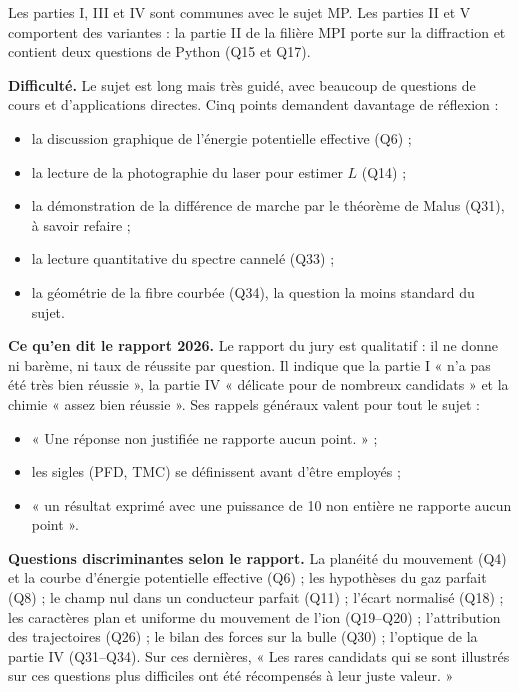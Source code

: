 \documentclass[11pt,a4paper]{article}
\providecommand{\tightlist}{\setlength{\itemsep}{0pt}\setlength{\parskip}{0pt}}
\begin{document}
Les parties I, III et IV sont communes avec le sujet MP. Les parties II et V comportent des variantes : la partie II de la filière MPI porte sur la diffraction et contient deux questions de Python (Q15 et Q17).

\textbf{Difficulté.} Le sujet est long mais très guidé, avec beaucoup de questions de cours et d'applications directes. Cinq points demandent davantage de réflexion :

\begin{itemize}
\tightlist
\item
  la discussion graphique de l'énergie potentielle effective (Q6) ;
\item
  la lecture de la photographie du laser pour estimer \(L\) (Q14) ;
\item
  la démonstration de la différence de marche par le théorème de Malus (Q31), à savoir refaire ;
\item
  la lecture quantitative du spectre cannelé (Q33) ;
\item
  la géométrie de la fibre courbée (Q34), la question la moins standard du sujet.
\end{itemize}

\textbf{Ce qu'en dit le rapport 2026.} Le rapport du jury est qualitatif : il ne donne ni barème, ni taux de réussite par question. Il indique que la partie I « n'a pas été très bien réussie », la partie IV « délicate pour de nombreux candidats » et la chimie « assez bien réussie ». Ses rappels généraux valent pour tout le sujet :

\begin{itemize}
\tightlist
\item
  « Une réponse non justifiée ne rapporte aucun point. » ;
\item
  les sigles (PFD, TMC) se définissent avant d'être employés ;
\item
  « un résultat exprimé avec une puissance de 10 non entière ne rapporte aucun point ».
\end{itemize}

\textbf{Questions discriminantes selon le rapport.} La planéité du mouvement (Q4) et la courbe d'énergie potentielle effective (Q6) ; les hypothèses du gaz parfait (Q8) ; le champ nul dans un conducteur parfait (Q11) ; l'écart normalisé (Q18) ; les caractères plan et uniforme du mouvement de l'ion (Q19--Q20) ; l'attribution des trajectoires (Q26) ; le bilan des forces sur la bulle (Q30) ; l'optique de la partie IV (Q31--Q34). Sur ces dernières, « Les rares candidats qui se sont illustrés sur ces questions plus difficiles ont été récompensés à leur juste valeur. »
\end{document}
